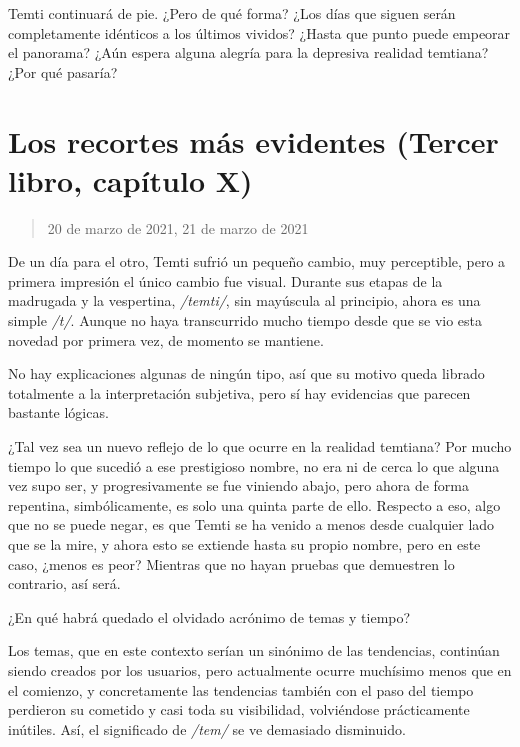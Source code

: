 \documentclass[
]{book}
\begin{document}
Temti continuará de pie. ¿Pero de qué forma? ¿Los días que siguen serán completamente idénticos a los últimos vividos? ¿Hasta que punto puede empeorar el panorama? ¿Aún espera alguna alegría para la depresiva realidad temtiana? ¿Por qué pasaría?

\hypertarget{los-recortes-muxe1s-evidentes-tercer-libro-capuxedtulo-x}{%
\section{Los recortes más evidentes (Tercer libro, capítulo X)}\label{los-recortes-muxe1s-evidentes-tercer-libro-capuxedtulo-x}}

\begin{quote}
20 de marzo de 2021, 21 de marzo de 2021
\end{quote}

De un día para el otro, Temti sufrió un pequeño cambio, muy perceptible, pero a primera impresión el único cambio fue visual. Durante sus etapas de la madrugada y la vespertina, \emph{/temti/}, sin mayúscula al principio, ahora es una simple \emph{/t/}. Aunque no haya transcurrido mucho tiempo desde que se vio esta novedad por primera vez, de momento se mantiene.

No hay explicaciones algunas de ningún tipo, así que su motivo queda librado totalmente a la interpretación subjetiva, pero sí hay evidencias que parecen bastante lógicas.

¿Tal vez sea un nuevo reflejo de lo que ocurre en la realidad temtiana? Por mucho tiempo lo que sucedió a ese prestigioso nombre, no era ni de cerca lo que alguna vez supo ser, y progresivamente se fue viniendo abajo, pero ahora de forma repentina, simbólicamente, es solo una quinta parte de ello. Respecto a eso, algo que no se puede negar, es que Temti se ha venido a menos desde cualquier lado que se la mire, y ahora esto se extiende hasta su propio nombre, pero en este caso, ¿menos es peor? Mientras que no hayan pruebas que demuestren lo contrario, así será.

¿En qué habrá quedado el olvidado acrónimo de temas y tiempo?

Los temas, que en este contexto serían un sinónimo de las tendencias, continúan siendo creados por los usuarios, pero actualmente ocurre muchísimo menos que en el comienzo, y concretamente las tendencias también con el paso del tiempo perdieron su cometido y casi toda su visibilidad, volviéndose prácticamente inútiles. Así, el significado de \emph{/tem/} se ve demasiado disminuido.
\end{document}
